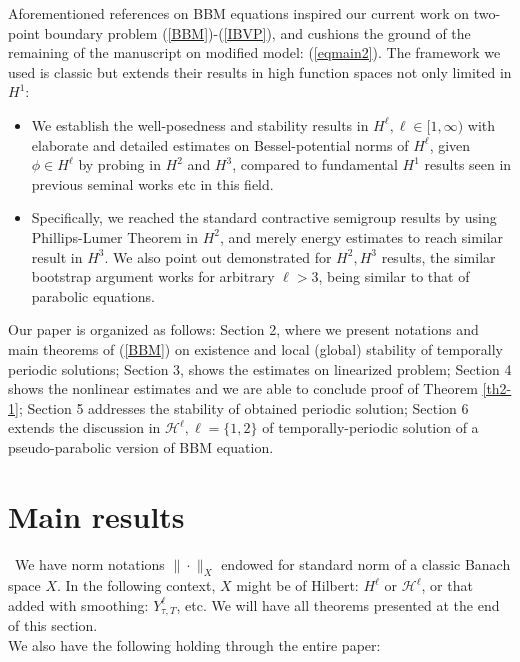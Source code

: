 \documentclass[10pt,a4paper,final]{article}
\numberwithin{equation}{section}
\newcommand{\cH}{\mathcal{H}}
\begin{document}
Aforementioned references \cite{BD, BL, BCSZ} on BBM equations inspired our current work on two-point boundary problem (\ref{BBM})-(\ref{IBVP}), and \cite{GChen} cushions the ground of the remaining of the manuscript on modified model: (\ref{eqmain2}). The framework we used is classic but extends their results in high function spaces not only limited in $H^1$:

\begin{itemize}
\item We establish the well-posedness and stability results in $H^\ell, \ell\in [1, \infty)$ with elaborate and detailed estimates on Bessel-potential norms of $H^\ell$, given $\phi\in H^\ell$ by probing in $H^2$ and $H^3$, compared to fundamental $H^1$ results seen in previous seminal works \cite{BD, BL, BCSZ} etc in this field.

\item Specifically, we reached the standard contractive semigroup results by using Phillips-Lumer Theorem in $H^2$, and merely energy estimates to reach similar result in $H^3$. We also point out demonstrated for $H^2, H^3$ results, the similar bootstrap argument works for arbitrary $\ell>3$, being similar to that of parabolic equations. 

\end{itemize}

Our paper is organized as follows: Section 2, where we present notations and main theorems of (\ref{BBM}) on existence and local (global) stability of temporally periodic solutions; Section 3, shows the estimates on linearized problem; Section 4 shows the nonlinear estimates and we are able to conclude proof of Theorem \ref{th2-1};  Section 5 addresses the stability of obtained periodic solution; Section 6 extends the discussion in $\cH^\ell, \ell = \{1, 2\}$ of temporally-periodic solution of a pseudo-parabolic version of BBM equation.

\section{Main results}

\ We have norm notations $\|\cdot\|_X$ endowed for standard norm of a classic Banach space $X$. In the following context, $X$ might be of Hilbert: $H^\ell$ or $\cH^\ell$, or that added with smoothing: $Y^\ell_{\tau, T}$, etc. We will have all theorems presented at the end of this section. \\

We also have the following holding through the entire paper:
\end{document}
